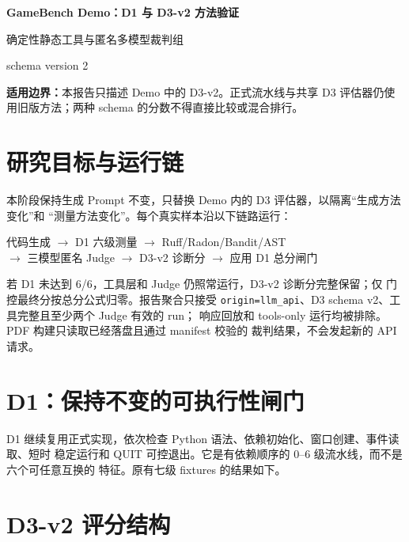 \documentclass[UTF8,zihao=-4,fontset=fandol]{ctexart}
\begin{document}



\begin{center}
  \vspace*{1.8cm}
  {\bfseries GameBench Demo：D1 与 D3-v2 方法验证\par}
  \vspace{0.8cm}
  {确定性静态工具与匿名多模型裁判组\par}
  \vspace{1.4cm}
  {\large schema version 2\par}
\end{center}

\vfill
\noindent\textbf{适用边界：}本报告只描述 Demo 中的 D3-v2。正式流水线与共享 D3
评估器仍使用旧版方法；两种 schema 的分数不得直接比较或混合排行。
\newpage
\tableofcontents
\newpage

\section{研究目标与运行链}

本阶段保持生成 Prompt 不变，只替换 Demo 内的 D3 评估器，以隔离“生成方法变化”和
“测量方法变化”。每个真实样本沿以下链路运行：
\begin{center}
代码生成 $\rightarrow$ D1 六级测量 $\rightarrow$ Ruff/Radon/Bandit/AST\\
$\rightarrow$ 三模型匿名 Judge $\rightarrow$ D3-v2 诊断分 $\rightarrow$ 应用 D1 总分闸门
\end{center}
若 D1 未达到 6/6，工具层和 Judge 仍照常运行，D3-v2 诊断分完整保留；仅
门控最终分按总分公式归零。报告聚合只接受
\texttt{origin=llm\_api}、D3 schema v2、工具完整且至少两个 Judge 有效的 run；
响应回放和 tools-only 运行均被排除。PDF 构建只读取已经落盘且通过 manifest 校验的
裁判结果，不会发起新的 API 请求。

\section{D1：保持不变的可执行性闸门}

D1 继续复用正式实现，依次检查 Python 语法、依赖初始化、窗口创建、事件读取、短时
稳定运行和 QUIT 可控退出。它是有依赖顺序的 0--6 级流水线，而不是六个可任意互换的
特征。原有七级 fixtures 的结果如下。



\section{D3-v2 评分结构}
\end{document}
